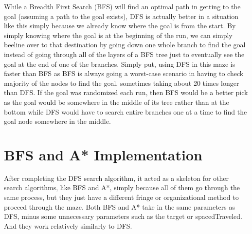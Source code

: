 \documentclass[11pt]{article}
\begin{document}
While a Breadth First Search (BFS) will find an optimal path in getting to the goal (assuming a path to the goal exists), DFS is actually better in a situation like this simply because we already know where the goal is from the start. By simply knowing where the goal is at the beginning of the run, we can simply beeline over to that destination by going down one whole branch to find the goal instead of going through all of the layers of a BFS tree just to eventually see the goal at the end of one of the branches. Simply put, using DFS in this maze is faster than BFS as BFS is always going a worst-case scenario in having to check majority of the nodes to find the goal, sometimes taking about 20 times longer than DFS. If the goal was randomized each run, then BFS would be a better pick as the goal would be somewhere in the middle of its tree rather than at the bottom while DFS would have to search entire branches one at a time to find the goal node somewhere in the middle.
	\pagebreak
\section{BFS and A* Implementation}
After completing the DFS search algorithm, it acted as a skeleton for other search algorithms, like BFS and A*, simply because all of them go through the same process, but they just have a different fringe or organizational method to proceed through the maze.
Both BFS and A* take in the same parameters as DFS, minus some unnecessary parameters such as the target or spacedTraveled. And they work relatively similarly to DFS.
\end{document}
